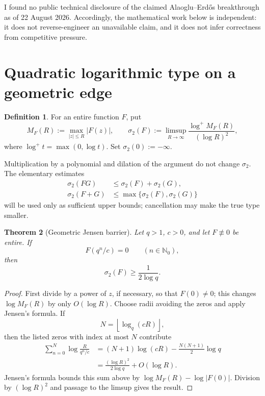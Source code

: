 \documentclass[11pt]{article}
\newtheorem{theorem}{Theorem}[section]
\theoremstyle{definition}
\newtheorem{definition}[theorem]{Definition}
\newcommand{\Nzero}{\mathbb N_0}
\begin{document}
I found no public technical disclosure of the claimed Alaoglu--Erd\H{o}s breakthrough as of 22 August 2026.  Accordingly, the mathematical work below is independent: it does not reverse-engineer an unavailable claim, and it does not infer correctness from competitive pressure.

\section{Quadratic logarithmic type on a geometric edge}

\begin{definition}\label{def:quad-type}
For an entire function \(F\), put
\[
  M_F(R):=\max_{|z|\le R}|F(z)|,
  \qquad
  \sigma_2(F):=\limsup_{R\to\infty}
  \frac{\log^+M_F(R)}{(\log R)^2},
\]
where \(\log^+t=\max(0,\log t)\).  Set \(\sigma_2(0):=-\infty\).
\end{definition}

Multiplication by a polynomial and dilation of the argument do not change \(\sigma_2\).  The elementary estimates
\begin{align}
  \sigma_2(FG)&\le \sigma_2(F)+\sigma_2(G),\label{eq:type-product}\\
  \sigma_2(F+G)&\le \max\{\sigma_2(F),\sigma_2(G)\}\label{eq:type-sum}
\end{align}
will be used only as sufficient upper bounds; cancellation may make the true type smaller.

\begin{theorem}[Geometric Jensen barrier]\label{thm:jensen-edge}
Let \(q>1\), \(c>0\), and let \(F\not\equiv0\) be entire.  If
\[
  F(q^n/c)=0\qquad(n\in\Nzero),
\]
then
\[
  \sigma_2(F)\ge \frac{1}{2\log q}.
\]
\end{theorem}

\begin{proof}
First divide by a power of \(z\), if necessary, so that \(F(0)\ne0\); this changes \(\log M_F(R)\) by only \(O(\log R)\).  Choose radii avoiding the zeros and apply Jensen's formula.  If
\[
  N=\left\lfloor\log_q(cR)\right\rfloor,
\]
then the listed zeros with index at most \(N\) contribute
\begin{align*}
  \sum_{n=0}^{N}\log\frac{R}{q^n/c}
   &=(N+1)\log(cR)-\frac{N(N+1)}2\log q\\
   &=\frac{(\log R)^2}{2\log q}+O(\log R).
\end{align*}
Jensen's formula bounds this sum above by \(\log M_F(R)-\log|F(0)|\).  Division by \((\log R)^2\) and passage to the limsup gives the result.
\end{proof}
\end{document}
